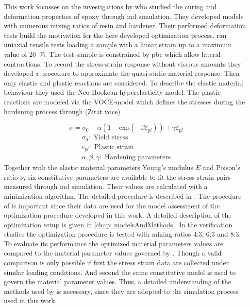 This work focusses on the investigations by \citet{ries_deciphering_nodate} who studied the curing and deformation properties of epoxy through \acrshort{md} simulation. They developed models with numerous mixing ratios of resin and hardener. Their performed deformation tests build the motivation for the here developed optimization process. \citet{ries_deciphering_nodate} ran uniaxial tensile tests loading a sample with a linear strain up to a maximum value of 20 \%. The test sample is constrained by \acrshort{pbc} which allow lateral contractions. To record the stress-strain response without viscous amounts they developed a procedure to approximate the quasi-static material response. Then only elastic and plastic reactions are considered. To describe the elastic material behaviour they used the Neo-Hookean hyperelasticity model. The plastic reactions are modeled via the VOCE-model which defines the stresses during the hardening process through (Zitat voce)

\begin{equation}
    \sigma = \sigma_0 + \alpha(1 - \text{exp}(-\beta \varepsilon_{pl})) + \gamma \varepsilon_{pl}
\end{equation}
\begin{gather*}
    \sigma_0: \text{ Yield stress} \\
    \varepsilon_{pl}: \text{ Plastic strain} \\
    \alpha, \beta,  \gamma: \text{ Hardening parameters}
\end{gather*}
Together with the elastic material parameters Young's modulus $E$ and Poison's ratio $\nu$, six constitutive parameters are available to fit the stress-strain pairs measured through \acrshort{md} simulation. Their values are calculated with a minimization algorithm. The detailed procedure is described in \cite{ries_deciphering_nodate}. The procedure of \citet{ries_deciphering_nodate} is important since their data are used for the model assessment of the optimization procedure developed in this work. A detailed description of the optimization setup is given in \autoref{chap: modelsAndMethods}. In the verification studies the optimization procedure is tested with mixing ratios 4:3, 6:3 and 8:3. To evaluate its performance the optimized material parameters values are compared to the material parameter values governed by \citet{ries_deciphering_nodate}. Though a valid comparison is only possible if first the stress strain data are collected under similar loading conditions. And second the same constitutive model is used to govern the material parameter values. Thus, a detailed understanding of the methods used by \citet{ries_deciphering_nodate} is necessary, since they are adopted to the simulation process used in this work.  




